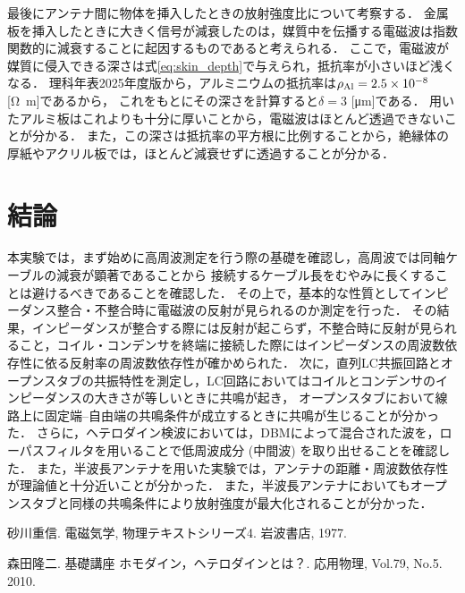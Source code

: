 \documentclass[uplatex,dvipdfmx,a4j,12pt]{jsarticle}
\begin{document}
最後にアンテナ間に物体を挿入したときの放射強度比について考察する．
金属板を挿入したときに大きく信号が減衰したのは，媒質中を伝播する電磁波は指数関数的に減衰することに起因するものであると考えられる．
ここで，電磁波が媒質に侵入できる深さは式\eqref{eq:skin_depth}で与えられ，抵抗率が小さいほど浅くなる．
理科年表2025年度版から，アルミニウムの抵抗率は$\rho_{\ce{Al}} = 2.5 \times 10^{-8}$ [\si{\ohm \meter}]であるから，
これをもとにその深さを計算すると$\delta = 3$ [\si{\micro \meter}]である．
用いたアルミ板はこれよりも十分に厚いことから，電磁波はほとんど透過できないことが分かる．
また，この深さは抵抗率の平方根に比例することから，絶縁体の厚紙やアクリル板では，ほとんど減衰せずに透過することが分かる．

\section{結論}

本実験では，まず始めに高周波測定を行う際の基礎を確認し，高周波では同軸ケーブルの減衰が顕著であることから
接続するケーブル長をむやみに長くすることは避けるべきであることを確認した．
その上で，基本的な性質としてインピーダンス整合・不整合時に電磁波の反射が見られるのか測定を行った．
その結果，インピーダンスが整合する際には反射が起こらず，不整合時に反射が見られること，コイル・コンデンサを終端に接続した際にはインピーダンスの周波数依存性に依る反射率の周波数依存性が確かめられた．
次に，直列LC共振回路とオープンスタブの共振特性を測定し，LC回路においてはコイルとコンデンサのインピーダンスの大きさが等しいときに共鳴が起き，
オープンスタブにおいて線路上に固定端--自由端の共鳴条件が成立するときに共鳴が生じることが分かった．
さらに，ヘテロダイン検波においては，DBMによって混合された波を，ローパスフィルタを用いることで低周波成分 (中間波) を取り出せることを確認した．
また，半波長アンテナを用いた実験では，アンテナの距離・周波数依存性が理論値と十分近いことが分かった．
また，半波長アンテナにおいてもオープンスタブと同様の共鳴条件により放射強度が最大化されることが分かった．

\begin{thebibliography}{9}
    砂川重信. 電磁気学, 物理テキストシリーズ4. 岩波書店, 1977.

  森田隆二. 基礎講座 ホモダイン，ヘテロダインとは？. 応用物理, Vol.79, No.5. 2010.

    
\end{thebibliography}
\end{document}
